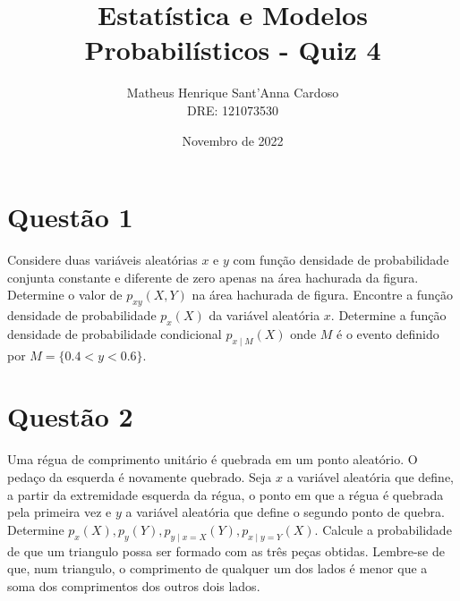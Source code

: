 \documentclass[a5paper]{report}
\title{Estatística e Modelos Probabilísticos - Quiz 4}
\author{
	Matheus Henrique Sant'Anna Cardoso\\
	DRE: 121073530
}
\date{Novembro de 2022}
\begin{document}
    \maketitle \newpage

\section*{Questão 1}
Considere duas variáveis aleatórias $x$ e $y$ com função densidade de probabilidade conjunta constante e diferente de zero apenas na área hachurada da figura. Determine o valor de $p_{xy}(X, Y)$ na área hachurada de figura. Encontre a função densidade de probabilidade $p_x(X)$ da variável aleatória $x$. Determine a função densidade de probabilidade condicional $p_{x \mid M}(X)$ onde $M$ é o evento definido por $M = \{0.4 < y < 0.6\}$.

\begin{center}
\end{center}

\section*{Questão 2}
Uma régua de comprimento unitário é quebrada em um ponto aleatório. O pedaço da esquerda é novamente quebrado. Seja $x$ a variável aleatória que define, a partir da extremidade esquerda da régua, o ponto em que a régua é quebrada pela primeira vez e $y$ a variável aleatória que define o segundo ponto de quebra. Determine $p_x(X), p_y(Y), p_{y \mid x = X}(Y), p_{x \mid y = Y}(X)$. Calcule a probabilidade de que um triangulo possa ser formado com as três peças obtidas. Lembre-se de que, num triangulo, o comprimento de qualquer um dos lados é menor que a soma dos comprimentos dos outros dois lados.
\end{document}
